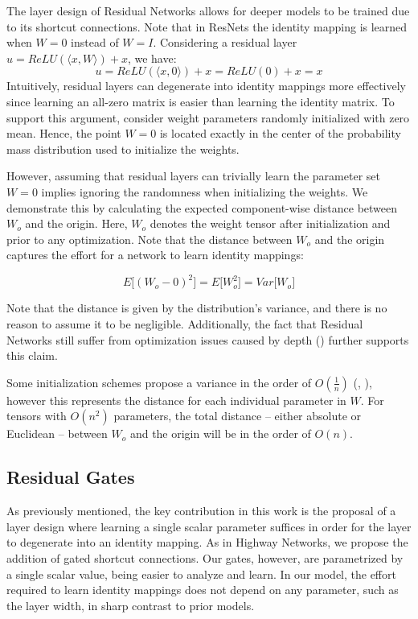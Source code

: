 \documentclass{article} %
\begin{document}
The layer design of Residual Networks allows for deeper models to be trained due to its shortcut connections. Note that in ResNets the identity mapping is learned when $W = 0$ instead of $W = I$. Considering a residual layer $u = ReLU( \langle x,W \rangle ) + x$, we have:
\begin{equation*}
	u = ReLU(\langle x, 0 \rangle) + x = ReLU(0) + x = x
\end{equation*}
Intuitively, residual layers can degenerate into identity mappings more effectively since learning an all-zero matrix is easier than learning the identity matrix. To support this argument, consider weight parameters randomly initialized with zero mean. Hence, the point $W = 0$ is located exactly in the center of the probability mass distribution used to initialize the weights.



However, assuming that residual layers can trivially learn the parameter set $W = 0$ implies ignoring the randomness when initializing the weights. We demonstrate this by calculating the expected component-wise distance between $W_{o}$ and the origin. Here, $W_{o}$ denotes the weight tensor after initialization and prior to any optimization. Note that the distance between $W_{o}$ and the origin captures the effort for a network to learn identity mappings:

\begin{equation*}
	E \Big [  (W_{o} - 0)^2  \Big ] = E \Big [  W_{o}^2  \Big ] =  Var \Big [  W_{o}  \Big ]
\end{equation*}

Note that the distance is given by the distribution's variance, and there is no reason to assume it to be negligible. Additionally, the fact that Residual Networks still suffer from optimization issues caused by depth (\cite{stdepth}) further supports this claim. 

Some initialization schemes propose a variance in the order of $O(\frac{1}{n})$ (\cite{glorotinit}, \cite{prelu}), however this represents the distance for each individual parameter in $W$. For tensors with $O(n^2)$ parameters, the total distance --  either absolute or Euclidean --  between $W_{o}$ and the origin will be in the order of $O(n)$.


\subsection{Residual Gates}

As previously mentioned, the key contribution in this work is the proposal of a layer design where learning a single scalar parameter suffices in order for the layer to degenerate into an identity mapping. As in Highway Networks, we propose the addition of gated shortcut connections. Our gates, however, are parametrized by a single scalar value, being easier to analyze and learn. In our model, the effort required to learn identity mappings does not depend on any parameter, such as the layer width, in sharp contrast to prior models.
\end{document}
